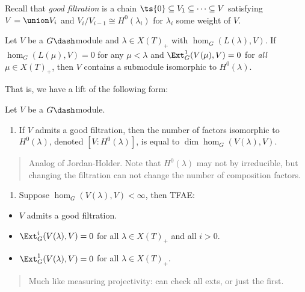 Recall that \emph{good filtration} is a chain
\(\ts{0} \subseteq V_1 \subseteq \cdots \subseteq V\) satisfying
\(V = \union V_i\) and \(V_i/V_{i-1} \cong H^0(\lambda_i)\) for
\(\lambda_i\) some weight of \(V\).

\begin{lemma}[?]

Let \(V\) be a \(G\dash\)module and \(\lambda \in X(T)_+\) with
\(\hom_G(L(\lambda), V)\). If \(\hom_G(L(\mu), V) = 0\) for any
\(\mu < \lambda\) and \(\Ext_G^1(V(\mu), V) = 0\) for \emph{all}
\(\mu \in X(T)_+\), then \(V\) contains a submodule isomorphic to
\(H^0(\lambda)\).

\end{lemma}

That is, we have a lift of the following form:

\begin{center}
\end{center}

\begin{theorem}

Let \(V\) be a \(G\dash\)module.

\begin{enumerate}
\def\labelenumi{\arabic{enumi}.}
\tightlist
\item
  If \(V\) admits a good filtration, then the number of factors
  isomorphic to \(H^0(\lambda)\), denoted \([V: H^0(\lambda)]\), is
  equal to \(\dim \hom_G(V(\lambda), V)\).
\end{enumerate}

\begin{quote}
Analog of Jordan-Holder. Note that \(H^0(\lambda)\) may not by
irreducible, but changing the filtration can not change the number of
composition factors.
\end{quote}

\begin{enumerate}
\def\labelenumi{\arabic{enumi}.}
\setcounter{enumi}{1}
\tightlist
\item
  Suppose \(\hom_G(V(\lambda), V)<\infty\), then TFAE:
\end{enumerate}

\begin{itemize}
\tightlist
\item
  \(V\) admits a good filtration.
\item
  \(\Ext^i_G(V(\lambda), V) = 0\) for all \(\lambda \in X(T)_+\) and all
  \(i>0\).
\item
  \(\Ext^1_G(V(\lambda), V) = 0\) for all \(\lambda \in X(T)_+\).
\end{itemize}

\begin{quote}
Much like measuring projectivity: can check all exts, or just the first.
\end{quote}

\end{theorem}

